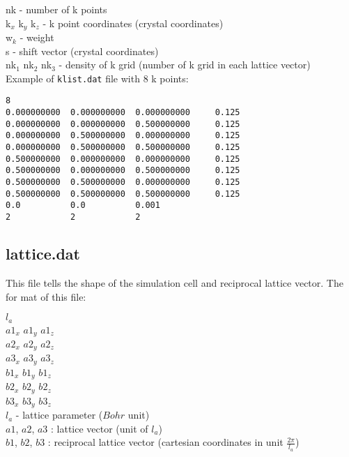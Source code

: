 \documentclass[letterpaper,12pt]{article}
\begin{document}
nk - number of k points\\
k$_x$ k$_y$ k$_z$ - k point coordinates (crystal coordinates)\\
w$_k$ - weight\\
s - shift vector (crystal coordinates)\\
nk$_1$ nk$_2$ nk$_3$ - density of k grid (number of k grid in each lattice vector)\\ 

Example of \verb+klist.dat+ file with 8 k points:

\verb+8+\\
\verb+0.000000000  0.000000000  0.000000000     0.125+\\
\verb+0.000000000  0.000000000  0.500000000     0.125+\\
\verb+0.000000000  0.500000000  0.000000000     0.125+\\
\verb+0.000000000  0.500000000  0.500000000     0.125+\\
\verb+0.500000000  0.000000000  0.000000000     0.125+\\
\verb+0.500000000  0.000000000  0.500000000     0.125+\\
\verb+0.500000000  0.500000000  0.000000000     0.125+\\
\verb+0.500000000  0.500000000  0.500000000     0.125+\\
\verb+0.0          0.0          0.001+\\
\verb+2            2            2+\\





\newpage
\subsection{lattice.dat}

This file tells the shape of the simulation cell and reciprocal lattice vector. 
The for mat of this file:

$l_a$\\
$a1_x$ $a1_y$ $a1_z$\\
$a2_x$ $a2_y$ $a2_z$\\
$a3_x$ $a3_y$ $a3_z$\\
$b1_x$ $b1_y$ $b1_z$\\
$b2_x$ $b2_y$ $b2_z$\\
$b3_x$ $b3_y$ $b3_z$\\

$l_a$ - lattice parameter ($Bohr$ unit)\\
$a1$, $a2$, $a3$ : lattice vector (unit of $l_a$)\\
$b1$, $b2$, $b3$ : reciprocal lattice vector (cartesian coordinates in unit  $\frac{2\pi}{l_a}$)
\end{document}
